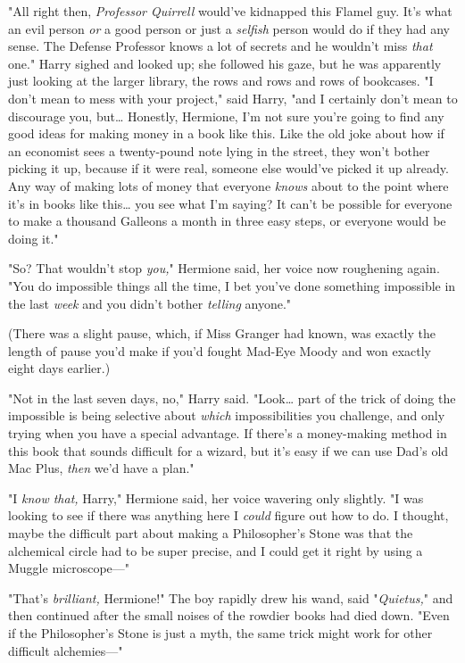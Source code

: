 "All right then, \emph{Professor Quirrell} would've kidnapped this Flamel guy.
It's what an evil person \emph{or} a good person or just a \emph{selfish}
person would do if they had any sense. The Defense Professor knows a lot of
secrets and he wouldn't miss \emph{that} one." Harry sighed and looked up; she
followed his gaze, but he was apparently just looking at the larger library,
the rows and rows and rows of bookcases. "I don't mean to mess with your
project," said Harry, "and I certainly don't mean to discourage you,
but{\ldots} Honestly, Hermione, I'm not sure you're going to find any good
ideas for making money in a book like this. Like the old joke about how if an
economist sees a twenty-pound note lying in the street, they won't bother
picking it up, because if it were real, someone else would've picked it up
already. Any way of making lots of money that everyone \emph{knows} about to
the point where it's in books like this{\ldots} you see what I'm saying? It
can't be possible for everyone to make a thousand Galleons a month in three
easy steps, or everyone would be doing it."

"So? That wouldn't stop \emph{you,}" Hermione said, her voice now roughening
again. "You do impossible things all the time, I bet you've done something
impossible in the last \emph{week} and you didn't bother \emph{telling} anyone."

(There was a slight pause, which, if Miss Granger had known, was exactly the
length of pause you'd make if you'd fought Mad-Eye Moody and won exactly eight
days earlier.)

"Not in the last seven days, no," Harry said. "Look{\ldots} part of the trick
of doing the impossible is being selective about \emph{which} impossibilities
you challenge, and only trying when you have a special advantage. If there's a
money-making method in this book that sounds difficult for a wizard, but it's
easy if we can use Dad's old Mac Plus, \emph{then} we'd have a plan."

"I \emph{know that,} Harry," Hermione said, her voice wavering only slightly.
"I was looking to see if there was anything here I \emph{could} figure out how
to do. I thought, maybe the difficult part about making a Philosopher's Stone
was that the alchemical circle had to be super precise, and I could get it
right by using a Muggle microscope---"

"That's \emph{brilliant,} Hermione!" The boy rapidly drew his wand, said
"\emph{Quietus,}" and then continued after the small noises of the rowdier
books had died down. "Even if the Philosopher's Stone is just a myth, the same
trick might work for other difficult alchemies---"

